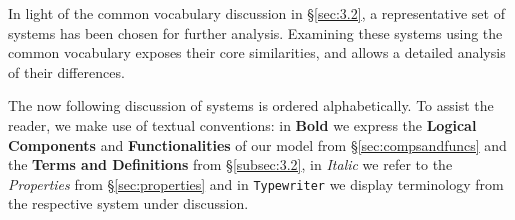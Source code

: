\documentclass{sig-alternate}
\begin{document}
\newcommand{\vocab}[1]{\textbf{#1}\xspace}
\newcommand{\prop}[1]{\textit{#1}\xspace}
\newcommand{\impterm}[1]{\texttt{#1}\xspace}

In light of the common vocabulary discussion in \S\ref{sec:3.2}, a
representative set of \pilot systems has been chosen for further analysis.
Examining these \pilot systems using the common vocabulary exposes their core
similarities, and allows a detailed analysis of their differences.

The now following discussion of \pilot systems is ordered alphabetically.
To assist the reader, we make use of textual conventions: in \vocab{Bold} we
express the \vocab{Logical Components} and \vocab{Functionalities} of our model
from \S\ref{sec:compsandfuncs} and the \vocab{Terms and Definitions} from
\S\ref{subsec:3.2}, in \prop{Italic} we refer to the \prop{Properties} from
\S\ref{sec:properties} and in \impterm{Typewriter} we display terminology from
the respective \pilot system under discussion.

\end{document}
